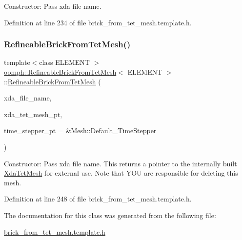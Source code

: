 Constructor\+: Pass xda file name. 



Definition at line 234 of file brick\+\_\+from\+\_\+tet\+\_\+mesh.\+template.\+h.

\mbox{\label{classoomph_1_1RefineableBrickFromTetMesh_a108febc7390d0c449d6dbd4a514c173e}} 
\subsubsection{\texorpdfstring{Refineable\+Brick\+From\+Tet\+Mesh()}{RefineableBrickFromTetMesh()}\hspace{0.1cm}{\footnotesize\ttfamily [2/2]}}
{\footnotesize\ttfamily template$<$class E\+L\+E\+M\+E\+NT $>$ \\
\hyperlink{classoomph_1_1RefineableBrickFromTetMesh}{oomph\+::\+Refineable\+Brick\+From\+Tet\+Mesh}$<$ E\+L\+E\+M\+E\+NT $>$\+::\hyperlink{classoomph_1_1RefineableBrickFromTetMesh}{Refineable\+Brick\+From\+Tet\+Mesh} (\begin{DoxyParamCaption}\item[{const std\+::string}]{xda\+\_\+file\+\_\+name,  }\item[{\hyperlink{classoomph_1_1XdaTetMesh}{Xda\+Tet\+Mesh}$<$ T\+Element$<$ 3, 3 $>$ $>$ $\ast$\&}]{xda\+\_\+tet\+\_\+mesh\+\_\+pt,  }\item[{Time\+Stepper $\ast$}]{time\+\_\+stepper\+\_\+pt = {\ttfamily \&Mesh\+:\+:Default\+\_\+TimeStepper} }\end{DoxyParamCaption})\hspace{0.3cm}{\ttfamily [inline]}}



Constructor\+: Pass xda file name. This returns a pointer to the internally built \hyperlink{classoomph_1_1XdaTetMesh}{Xda\+Tet\+Mesh} for external use. Note that Y\+OU are responsible for deleting this mesh. 



Definition at line 248 of file brick\+\_\+from\+\_\+tet\+\_\+mesh.\+template.\+h.



The documentation for this class was generated from the following file\+:\begin{DoxyCompactItemize}
\item 
\hyperlink{brick__from__tet__mesh_8template_8h}{brick\+\_\+from\+\_\+tet\+\_\+mesh.\+template.\+h}\end{DoxyCompactItemize}
